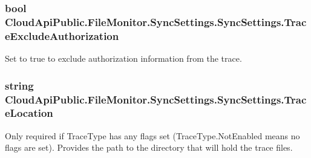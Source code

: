 \hypertarget{class_cloud_api_public_1_1_file_monitor_1_1_sync_settings_1_1_sync_settings_a994b4f12563c8a2da8457532f5d7e436}{
\subsubsection[{Trace\-Exclude\-Authorization}]{\setlength{\rightskip}{0pt plus 5cm}bool Cloud\-Api\-Public.\-File\-Monitor.\-Sync\-Settings.\-Sync\-Settings.\-Trace\-Exclude\-Authorization\hspace{0.3cm}{\ttfamily [get]}}}\label{class_cloud_api_public_1_1_file_monitor_1_1_sync_settings_1_1_sync_settings_a994b4f12563c8a2da8457532f5d7e436}


Set to true to exclude authorization information from the trace. 

\hypertarget{class_cloud_api_public_1_1_file_monitor_1_1_sync_settings_1_1_sync_settings_a75ff644a102cf658db1bf573953025fc}{
\subsubsection[{Trace\-Location}]{\setlength{\rightskip}{0pt plus 5cm}string Cloud\-Api\-Public.\-File\-Monitor.\-Sync\-Settings.\-Sync\-Settings.\-Trace\-Location\hspace{0.3cm}{\ttfamily [get]}}}\label{class_cloud_api_public_1_1_file_monitor_1_1_sync_settings_1_1_sync_settings_a75ff644a102cf658db1bf573953025fc}


Only required if Trace\-Type has any flags set (Trace\-Type.\-Not\-Enabled means no flags are set). Provides the path to the directory that will hold the trace files. 

